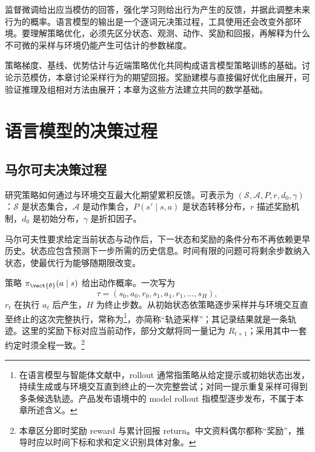 \documentclass[../textbook.tex]{subfiles}
\begin{document}
\fi
{}

监督微调给出应当模仿的回答，强化学习则给出行为产生的反馈，并据此调整未来行为的概率。语言模型的输出是一个逐词元决策过程，工具使用还会改变外部环境。要理解策略优化，必须先区分状态、观测、动作、奖励和回报，再解释为什么不可微的采样与环境仍能产生可估计的参数梯度。

策略梯度、基线、优势估计与近端策略优化共同构成语言模型策略训练的基础。讨论示范模仿，本章讨论采样行为的期望回报。奖励建模与直接偏好优化由展开，可验证推理及组相对方法由展开；本章为这些方法建立共同的数学基础。

\section{语言模型的决策过程}

\subsection{马尔可夫决策过程}
研究策略如何通过与环境交互最大化期望累积反馈。可表示为 $(\mathcal S,\mathcal A,P,r,d_0,\gamma)$：$\mathcal S$ 是状态集合，$\mathcal A$ 是动作集合，$P(s'\mid s,a)$ 是状态转移分布，$r$ 描述奖励机制，$d_0$ 是初始分布，$\gamma$ 是折扣因子。

马尔可夫性要求给定当前状态与动作后，下一状态和奖励的条件分布不再依赖更早历史。状态应包含预测下一步所需的历史信息。时间有限的问题可将剩余步数纳入状态，使最优行为能够随期限改变。

策略 $\pi_{\vect{\theta}}(a\mid s)$ 给出动作概率。一次写为
\begin{equation}
 \tau=(s_0,a_0,r_0,s_1,a_1,r_1,\ldots,s_H),
\end{equation}
$r_t$ 在执行 $a_t$ 后产生，$H$ 为终止步数。从初始状态依策略逐步采样并与环境交互直至终止的这次完整执行，常称为\footnote{在语言模型与智能体文献中，rollout 通常指策略从给定提示或初始状态出发，持续生成或与环境交互直到终止的一次完整尝试；对同一提示重复采样可得到多条候选轨迹。产品发布语境中的 model rollout 指模型逐步发布，不属于本章所述含义。}，亦简称“轨迹采样”；其记录结果就是一条轨迹。这里的奖励下标对应当前动作，部分文献将同一量记为 $R_{t+1}$；采用其中一套约定时须全程一致。\footnote{本章区分即时奖励 reward 与累计回报 return。中文资料偶尔都称“奖励”，推导时应以时间下标和求和定义识别具体对象。}
\end{document}
